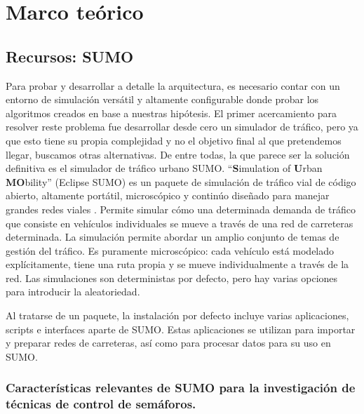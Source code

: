 
\chapter{Marco teórico} %
\graphicspath{{./../imagenes/}}
\linespread{1.3}
\hypertarget{recursos-sumo}{%
\section{Recursos: SUMO}\label{recursos-sumo}}

Para probar y desarrollar a detalle la arquitectura, es necesario contar
con un entorno de simulación versátil y altamente configurable donde
probar los algoritmos creados en base a nuestras hipótesis. El primer
acercamiento para resolver reste problema fue desarrollar desde cero un
simulador de tráfico, pero ya que esto tiene su propia complejidad y no
el objetivo final al que pretendemos llegar, buscamos otras
alternativas. De entre todas, la que parece ser la solución definitiva
es el simulador de tráfico urbano SUMO. ``\textbf{S}imulation of
\textbf{U}rban \textbf{MO}bility'' (Eclipse SUMO) es un paquete de
simulación de tráfico vial de código abierto, altamente portátil,
microscópico y continúo diseñado para manejar grandes redes viales
\textcite{SUMO2018}. Permite simular cómo una determinada demanda de
tráfico que consiste en vehículos individuales se mueve a través de una
red de carreteras determinada. La simulación permite abordar un amplio
conjunto de temas de gestión del tráfico. Es puramente microscópico:
cada vehículo está modelado explícitamente, tiene una ruta propia y se
mueve individualmente a través de la red. Las simulaciones son
deterministas por defecto, pero hay varias opciones para introducir la
aleatoriedad.

Al tratarse de un paquete, la instalación por defecto incluye varias
aplicaciones, scripts e interfaces aparte de SUMO. Estas aplicaciones se
utilizan para importar y preparar redes de carreteras, así como para
procesar datos para su uso en SUMO.

\hypertarget{caracteruxedsticas-relevantes-de-sumo-para-la-investigaciuxf3n-de-tuxe9cnicas-de-control-de-semuxe1foros.}{%
\subsection{Características relevantes de SUMO para la investigación de
técnicas de control de
semáforos.}\label{caracteruxedsticas-relevantes-de-sumo-para-la-investigaciuxf3n-de-tuxe9cnicas-de-control-de-semuxe1foros.}}

